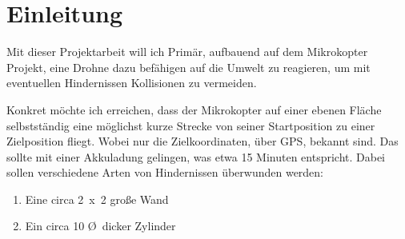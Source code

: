 \section{Einleitung}
\label{sec:einleitung}
Mit dieser Projektarbeit will ich Primär, aufbauend auf dem Mikrokopter Projekt,
eine Drohne dazu befähigen auf die Umwelt zu reagieren,
um mit eventuellen Hindernissen Kollisionen zu vermeiden.

Konkret möchte ich erreichen, dass der Mikrokopter auf einer ebenen Fläche
selbstständig eine möglichst kurze Strecke von seiner Startposition zu einer Zielposition fliegt.
Wobei nur die Zielkoordinaten, über \ac{GPS}, bekannt sind.
Das sollte mit einer Akkuladung gelingen, was etwa 15 Minuten entspricht.
Dabei sollen verschiedene Arten von Hindernissen überwunden werden:

\begin{enumerate}
    \item Eine circa \unit{2 x 2}{\metre} große Wand
    \item Ein circa \unit{10}{\centi\metre} \O\ dicker Zylinder
\end{enumerate}

